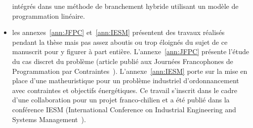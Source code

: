 \begin{itemize}
  intégrés dans une méthode de branchement hybride utilisant un modèle
  de programmation linéaire.  
\item les annexes~\ref{ann:JFPC} et~\ref{ann:IESM} présentent des
  travaux réalisés pendant la thèse mais pas assez aboutis ou trop
  éloignés du sujet de ce manuscrit pour y figurer à part entière.
  L'annexe~\ref{ann:JFPC} présente l'étude du cas discret du problème
  (article publié aux Journées Francophones de Programmation par
  Contraintes~\cite{Nattaf_JFPC}). L'annexe~\ref{ann:IESM} porte sur
  la mise en place d'une matheuristique pour un problème industriel
  d'ordonnancement avec contraintes et objectifs énergétiques. Ce
  travail s'inscrit dans le cadre d'une collaboration pour un projet
  franco-chilien et a été publié dans la conférence IESM (International
  Conference on Industrial Engineering and Systems
  Management~\cite{Nattaf_IESM}). 
\end{itemize}










